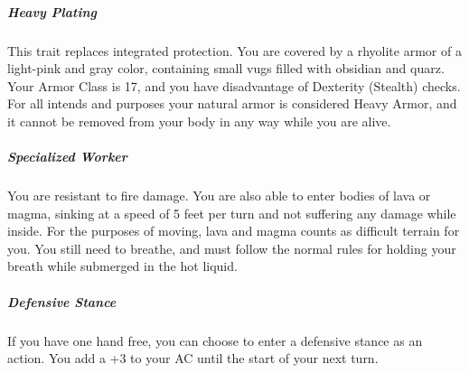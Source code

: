     \subparagraph{Heavy Plating} This trait replaces integrated protection.
    You are covered by a rhyolite armor of a light-pink and gray color, containing small vugs filled with obsidian and quarz.
    Your Armor Class is 17, and you have disadvantage of Dexterity (Stealth) checks.
    For all intends and purposes your natural armor is considered Heavy Armor, and it cannot be removed from your body in any way while you are alive.

    \subparagraph{Specialized Worker} You are resistant to fire damage.
    You are also able to enter bodies of lava or magma, sinking at a speed of 5 feet per turn and not suffering any damage while inside.
    For the purposes of moving, lava and magma counts as difficult terrain for you.
    You still need to breathe, and must follow the normal rules for holding your breath while submerged in the hot liquid.

    \subparagraph{Defensive Stance} If you have one hand free, you can choose to enter a defensive stance as an action.
    You add a +3 to your AC until the start of your next turn.

